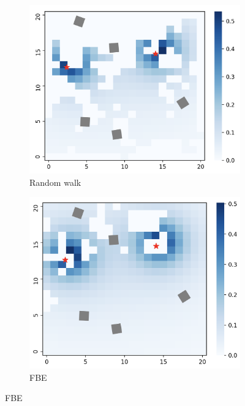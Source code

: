 \begin{figure}[h]
    \centering
    \begin{subfigure}{0.49\textwidth}
        \includegraphics[width=\textwidth]{images/heatmap_random.png}
        \caption{Random walk}
        \label{results:beliefrandom}
    \end{subfigure}
    \begin{subfigure}{0.49\textwidth}
        \includegraphics[width=\textwidth]{images/heatmap_frontier.png}
        \caption{FBE}
        \label{results:belieffrontier}
    \end{subfigure}

\end{figure}
